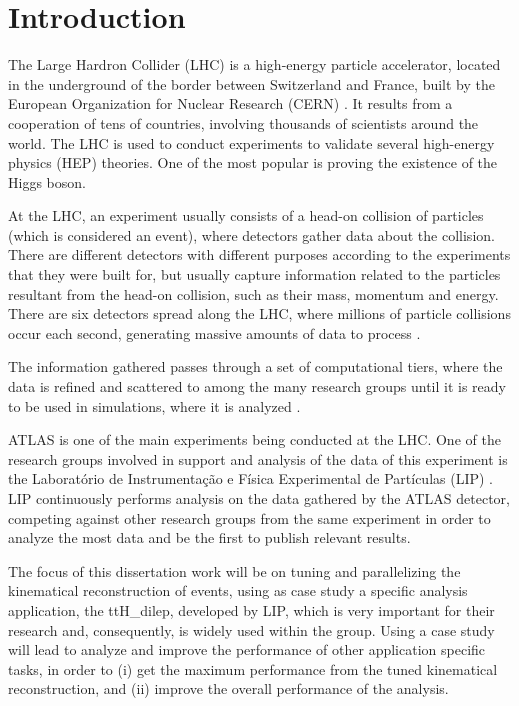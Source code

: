 
\chapter{Introduction}

The Large Hardron Collider (LHC) \cite{CERN:LHC} is a high-energy particle accelerator, located in the underground of the border between Switzerland and France, built by the European Organization for Nuclear Research (CERN) \cite{CERN}. It results from a cooperation of tens of countries, involving thousands of scientists around the world. The LHC is used to conduct experiments to validate several high-energy physics (HEP) theories. One of the most popular is proving the existence of the Higgs boson.

At the LHC, an experiment usually consists of a head-on collision of particles (which is considered an event), where detectors gather data about the collision. There are different detectors with different purposes according to the experiments that they were built for, but usually capture information related to the particles resultant from the head-on collision, such as their mass, momentum and energy. There are six detectors spread along the LHC, where millions of particle collisions occur each second, generating massive amounts of data to process \cite{LIP:Ibergrid}.

The information gathered passes through a set of computational tiers, where the data is refined and scattered to among the many research groups until it is ready to be used in simulations, where it is analyzed \cite{CERN:DATA}.

ATLAS \cite{CERN:ATLAS} is one of the main experiments being conducted at the LHC. One of the research groups involved in support and analysis of the data of this experiment is the Laboratório de Instrumentação e Física Experimental de Partículas (LIP) \cite{LIP}. LIP continuously performs analysis on the data gathered by the ATLAS detector, competing against other research groups from the same experiment in order to analyze the most data and be the first to publish relevant results.

The focus of this dissertation work will be on tuning and parallelizing the kinematical reconstruction of events, using as case study a specific analysis application, the ttH\_dilep, developed by LIP, which is very important for their research and, consequently, is widely used within the group. Using a case study will lead to analyze and improve the performance of other application specific tasks, in order to (i) get the maximum performance from the tuned kinematical reconstruction, and (ii) improve the overall performance of the analysis.

